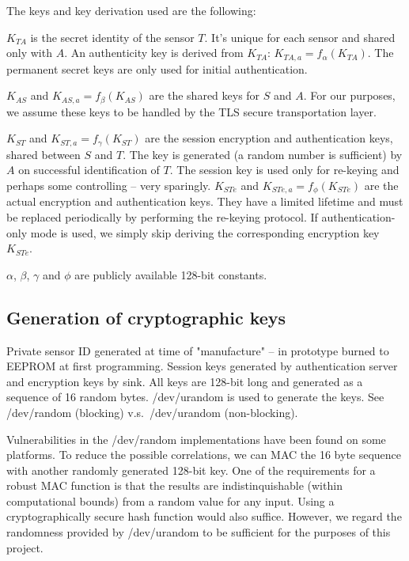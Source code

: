 The keys and key derivation used are the following:
%
\begin{description}
\item $K_{TA}$ is the secret identity of the sensor $T$. It's unique for each sensor and shared only with $A$. An authenticity key is derived from $K_{TA}$: $K_{TA,a} = f_\alpha(K_{TA})$. The permanent secret keys are only used for initial authentication.
\item $K_{AS}$ and $K_{AS,a}=f_\beta(K_{AS})$ are the shared keys for $S$ and $A$. For our purposes, we assume these keys to be handled by the TLS secure transportation layer.
\item $K_{ST}$ and $K_{ST,a}=f_\gamma(K_{ST})$ are the session encryption and authentication keys, shared between $S$ and $T$. The key is generated (a random number is sufficient) by $A$ on successful identification of $T$. The session key is used only for re-keying and perhaps some controlling -- very sparingly.
$K_{STe}$ and $K_{STe,a}=f_\phi(K_{STe})$ are the actual encryption and authentication keys. They have a limited lifetime and must be replaced periodically by performing the re-keying protocol. If authentication-only mode is used, we simply skip deriving the corresponding encryption key $K_{STe}$.
\end{description}
$\alpha$, $\beta$, $\gamma$ and $\phi$ are publicly available 128-bit constants.

\subsection{Generation of cryptographic keys}

Private sensor ID generated at time of "manufacture" -- in prototype burned to EEPROM at first programming. Session keys generated by authentication server and encryption keys by sink. All keys are 128-bit long and generated as a sequence of 16 random bytes. /dev/urandom is used to generate the keys. See /dev/random (blocking) v.s.\ /dev/urandom (non-blocking).

Vulnerabilities in the /dev/random implementations have been found on some platforms. To reduce the possible correlations, we can MAC the 16 byte sequence with another randomly generated 128-bit key. One of the requirements for a robust MAC function is that the results are indistinquishable (within computational bounds) from a random value for any input. Using a cryptographically secure hash function would also suffice. However, we regard the randomness provided by /dev/urandom to be sufficient for the purposes of this project.

